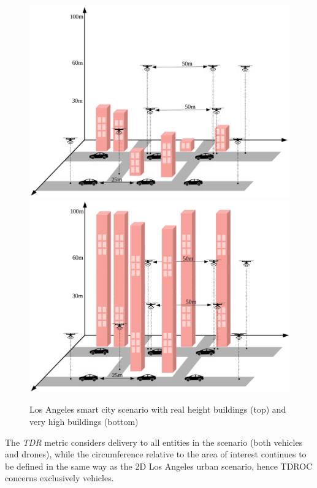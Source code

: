 		\begin{figure}[H]
			\centering
			\includegraphics[width=1.0\textwidth]{immagini/la-smart-city-low}
			\includegraphics[width=1.0\textwidth]{immagini/la-smart-city-high}
			\caption{Los Angeles smart city scenario with real height buildings (top) and very high buildings (bottom)}
			\label{fig:la-smart-city}
		\end{figure}
		
		
		The \textit{TDR} metric considers delivery to all entities in the scenario (both vehicles and drones), while the circumference relative to the area of interest continues to be defined in the same way as the 2D Los Angeles urban scenario, hence TDROC concerns exclusively vehicles.
		
